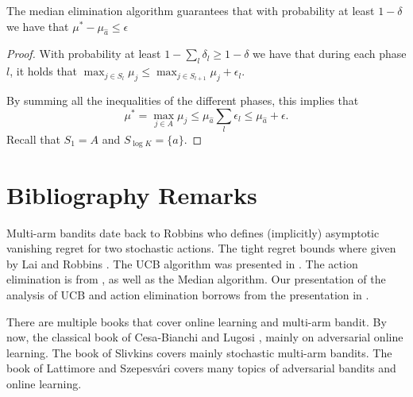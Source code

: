 \begin{theorem}
The median elimination algorithm guarantees that with probability at least $1-\delta$ we have that $\mu^*-\mu_{\hat{a}}\leq \epsilon$
\end{theorem}

\begin{proof}
With probability at least $1- \sum_l \delta_l \geq 1-\delta$ we have that during each phase $l$, it holds that $\max_{j\in
S_{l}}\mu_{j} \leq \max_{j\in S_{l+1}}\mu_{j}+ \epsilon_{l}$.

By summing all the inequalities of the different phases,
this implies that
\[
\mu^*=\max_{j\in
A} \mu_{j} \leq \mu_{\hat{a}} \sum_l \epsilon_{l}\leq \mu_{\hat{a}} +\epsilon.
\]
Recall that $S_1=A$ and $S_{\log K} =\{\hat{a}\}$.
\end{proof}

\section{Bibliography Remarks}

Multi-arm bandits date back to Robbins \cite{Robbins52} who defines (implicitly) asymptotic vanishing regret for two stochastic actions. The tight regret bounds where given by Lai and Robbins \cite{LaiR85}. The UCB algorithm was presented in \cite{AuerCF02}. The action elimination is from \cite{Even-DarMM06}, as well as the Median algorithm. Our presentation of the analysis of UCB and action elimination borrows from the presentation in  \cite{Slivkins-book-19}.


There are multiple books that cover online learning and multi-arm bandit. By now, the classical book of Cesa{-}Bianchi and Lugosi \cite{Cesa-Bianchi-Lugosi-book}, mainly on adversarial online learning. The book of Slivkins \cite{Slivkins-book-19} covers mainly stochastic multi-arm bandits. The book of Lattimore and Szepesv{\'a}ri \cite{Lattimore-Csaba-book-2020} covers many topics of adversarial bandits and online learning.
